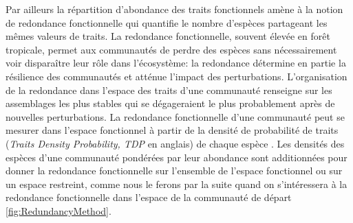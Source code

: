 \documentclass[
  11pt,
  french,
  A4paper,
  extrafontsizes,onecolumn,openright
  ]{memoir}
\begin{document}
Par ailleurs la répartition d'abondance des traits fonctionnels amène à
la notion de redondance fonctionnelle qui quantifie le nombre d'espèces
partageant les mêmes valeurs de traits. La redondance fonctionnelle,
souvent élevée en forêt tropicale, permet aux communautés de perdre des
espèces sans nécessairement voir disparaître leur rôle dans
l'écosystème: la redondance détermine en partie la résilience des
communautés et atténue l'impact des perturbations. L'organisation de la
redondance dans l'espace des traits d'une communauté renseigne sur les
assemblages les plus stables qui se dégageraient le plus probablement
après de nouvelles perturbations. La redondance fonctionnelle d'une
communauté peut se mesurer dans l'espace fonctionnel à partir de la
densité de probabilité de traits (\emph{Traits Density Probability, TDP}
en anglais) de chaque espèce \autocite{Carmona2016}. Les densités des
espèces d'une communauté pondérées par leur abondance sont additionnées
pour donner la redondance fonctionnelle sur l'ensemble de l'espace
fonctionnel ou sur un espace restreint, comme nous le ferons par la
suite quand on s'intéressera à la redondance fonctionnelle dans l'espace
de la communauté de départ \ref{fig:RedundancyMethod}.
\end{document}
